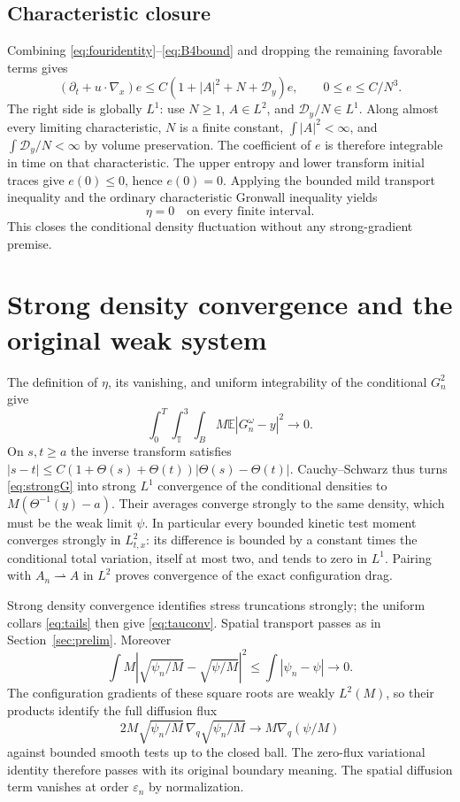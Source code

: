 \documentclass[11pt]{article}
\numberwithin{equation}{section}
\newcommand{\T}{\mathbb T^3}
\newcommand{\E}{\mathbb E}
\newcommand{\grad}{\nabla}
\newcommand{\Dy}{\mathcal D_y}
\newcommand{\weak}{\rightharpoonup}
\begin{document}
\subsection{Characteristic closure}\label{subsec:Gronwall}
Combining \eqref{eq:fouridentity}--\eqref{eq:B4bound} and dropping the
remaining favorable terms gives
\begin{equation}\label{eq:Gronwall}
 (\partial_t+u\cdot\grad_x)e
 \leq C(1+|A|^2+N+\Dy)e,
 \qquad 0\leq e\leq C/N^3.
\end{equation}
The right side is globally $L^1$: use $N\geq1$, $A\in L^2$, and
$\Dy/N\in L^1$. Along almost every limiting characteristic, $N$ is a
finite constant, $\int|A|^2<\infty$, and $\int\Dy/N<\infty$ by volume
preservation. The coefficient of $e$ is therefore integrable in time on that
characteristic. The upper entropy and lower transform initial traces give
$e(0)\leq0$, hence $e(0)=0$. Applying the bounded mild transport inequality
and the ordinary characteristic Gronwall inequality yields
\begin{equation}\label{eq:eta0}
 \eta=0\quad\text{on every finite interval.}
\end{equation}
This closes the conditional density fluctuation without any strong-gradient
premise.

\section{Strong density convergence and the original weak system}\label{sec:final}
The definition of $\eta$, its vanishing, and uniform integrability of the
conditional $G_n^2$ give
\begin{equation}\label{eq:strongG}
 \int_0^T\int_\T\int_BM\E|G_n^\omega-y|^2\longrightarrow0.
\end{equation}
On $s,t\geq a$ the inverse transform satisfies
$|s-t|\leq C(1+\Theta(s)+\Theta(t))|\Theta(s)-\Theta(t)|$.
Cauchy--Schwarz thus turns \eqref{eq:strongG} into strong $L^1$ convergence
of the conditional densities to $M(\Theta^{-1}(y)-a)$.
Their averages converge strongly to the same density, which must be the weak
limit $\psi$. In particular every bounded kinetic test moment converges
strongly in $L^2_{t,x}$: its difference is bounded by a constant times the
conditional total variation, itself at most two, and tends to zero in $L^1$.
Pairing with $A_n\weak A$ in $L^2$ proves convergence of the exact
configuration drag.

Strong density convergence identifies stress truncations strongly; the uniform
collars \eqref{eq:tails} then give \eqref{eq:tauconv}.
Spatial transport passes as in Section~\ref{sec:prelim}.
Moreover
\[
 \int M|\sqrt{\psi_n/M}-\sqrt{\psi/M}|^2\leq\int|\psi_n-\psi|\to0.
\]
The configuration gradients of these square roots are weakly $L^2(M)$, so
their products identify the full diffusion flux
\[
 2M\sqrt{\psi_n/M}\,\grad_q\sqrt{\psi_n/M}
       \longrightarrow M\grad_q(\psi/M)
\]
against bounded smooth tests up to the closed ball. The zero-flux variational
identity therefore passes with its original boundary meaning. The spatial
diffusion term vanishes at order $\varepsilon_n$ by normalization.
\end{document}
